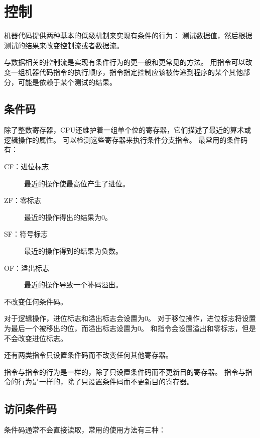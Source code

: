 
\section{控制}
{
    机器代码提供两种基本的低级机制来实现有条件的行为：
    测试数据值，然后根据测试的结果来改变控制流或者数据流。

    与数据相关的控制流是实现有条件行为的更一般和更常见的方法。
    用指令可以改变一组机器代码指令的执行顺序，指令指定控制应该被传递到程序的某个其他部分，可能是依赖于某个测试的结果。

    \subsection{条件码}
    {
        除了整数寄存器，CPU还维护着一组单个位的寄存器，它们描述了最近的算术或逻辑操作的属性。
        可以检测这些寄存器来执行条件分支指令。
        最常用的条件码有：

        \begin{description}
            \item[CF：进位标志] 最近的操作使最高位产生了进位。
            \item[ZF：零标志] 最近的操作得出的结果为0。
            \item[SF：符号标志] 最近的操作得到的结果为负数。
            \item[OF：溢出标志] 最近的操作导致一个补码溢出。
        \end{description}

        不改变任何条件码。

        对于逻辑操作，进位标志和溢出标志会设置为0。
        对于移位操作，进位标志将设置为最后一个被移出的位，而溢出标志设置为0。
        和指令会设置溢出和零标志，但是不会改变进位标志。

        还有两类指令只设置条件码而不改变任何其他寄存器。

        指令与指令的行为是一样的，除了只设置条件码而不更新目的寄存器。
        指令与指令的行为是一样的，除了只设置条件码而不更新目的寄存器。
    }

    \subsection{访问条件码}
    {
        条件码通常不会直接读取，常用的使用方法有三种：

}}
